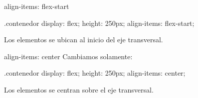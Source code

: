 \documentclass[aspectratio=169,11.5pt]{beamer}
\begin{document}
    \begin{frame}[fragile]{align-items: flex-start}
        \begin{csscodedark}
            .contenedor {
                display: flex;
                height: 250px;
                align-items: flex-start;
            }
        \end{csscodedark}

        \begin{center}
        \end{center}

        Los elementos se ubican al inicio
        del eje transversal.
    \end{frame}

    \begin{frame}[fragile]{align-items: center}
        Cambiamos solamente:

        \begin{csscodedark}
            .contenedor {
                display: flex;
                height: 250px;
                align-items: center;
            }
        \end{csscodedark}

        \begin{center}
        \end{center}

        Los elementos se centran sobre
        el eje transversal.
    \end{frame}
\end{document}
